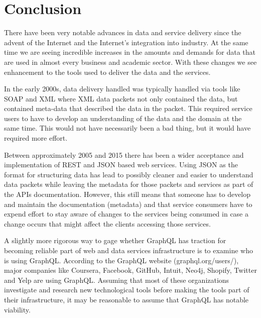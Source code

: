 \section{Conclusion}
There have been very notable advances in data and service delivery since the 
advent of the Internet and the Internet's integration into industry.  At the 
same time we are seeing incredible increases in the amounts and demands for 
data that are used in almost every business and academic sector.  With these 
changes we see enhancement to the tools used to deliver the data and the 
services.  

In the early 2000s, data delivery handled was typically handled via tools like 
SOAP and XML where XML data packets not only contained the data, but contained 
meta-data that described the data in the packet.  This required service users 
to have to develop an understanding of the data and the domain at the same 
time.  This would not have necessarily been a bad thing, but it would have 
required more effort.

Between approximately 2005 and 2015 there has been a wider acceptance and 
implementation of REST and JSON based web services.  Using JSON as the format 
for structuring data has lead to possibly cleaner and easier to understand 
data packets while leaving the metadata for those packets and services as part 
of the APIs documentation.  However, this still means that someone has to 
develop and maintain the documentation (metadata) and that service consumers 
have to expend effort to stay aware of changes to the services being consumed 
in case a change occurs that might affect the clients accessing those services.

A slightly more rigorous way to gage whether GraphQL has traction for becoming 
reliable part of web and data services infrastructure is to examine who is 
using GraphQL.  According to the GraphQL website (graphql.org/users/), major 
companies like Coursera, Facebook, GitHub, Intuit, Neo4j, Shopify, Twitter 
and Yelp are using GraphQL\cite{hid505GraphQLUsers2018}.  Assuming that most of 
these organizations investigate and research new technological tools before 
making the tools part of their infrastructure, it may be reasonable to assume 
that GraphQL has notable viability.

